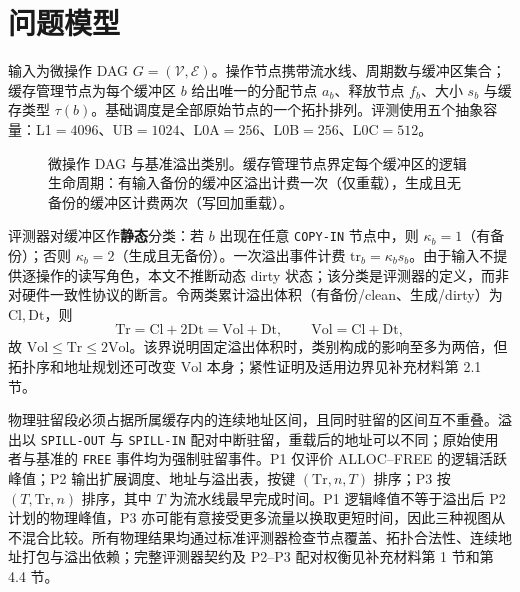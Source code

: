 \section{问题模型}\label{sec:formulation}
输入为微操作 DAG $G=(\mathcal V,\mathcal E)$。操作节点携带流水线、周期数与缓冲区集合；缓存管理节点为每个缓冲区 $b$ 给出唯一的分配节点 $a_b$、释放节点 $f_b$、大小 $s_b$ 与缓存类型 $\tau(b)$。基础调度是全部原始节点的一个拓扑排列。评测使用五个抽象容量：L1${}=4096$、UB${}=1024$、L0A${}=256$、L0B${}=256$、L0C${}=512$。

\begin{figure}[t]\centering
\resizebox{.98\linewidth}{!}{}
\caption{微操作 DAG 与基准溢出类别。缓存管理节点界定每个缓冲区的逻辑生命周期：有输入备份的缓冲区溢出计费一次（仅重载），生成且无备份的缓冲区计费两次（写回加重载）。}
\label{fig:dag-example-zh}\end{figure}

评测器对缓冲区作\textbf{静态}分类：若 $b$ 出现在任意 \texttt{COPY-IN} 节点中，则 $\kappa_b=1$（有备份）；否则 $\kappa_b=2$（生成且无备份）。一次溢出事件计费 $\mathrm{tr}_b=\kappa_b s_b$。由于输入不提供逐操作的读写角色，本文不推断动态 dirty 状态；该分类是评测器的定义，而非对硬件一致性协议的断言。令两类累计溢出体积（有备份/clean、生成/dirty）为 $\mathrm{Cl},\mathrm{Dt}$，则
\begin{equation}\label{eq:extra-decomp-zh}\mathrm{Tr}=\mathrm{Cl}+2\mathrm{Dt}=\mathrm{Vol}+\mathrm{Dt},\qquad \mathrm{Vol}=\mathrm{Cl}+\mathrm{Dt},\end{equation}
故 $\mathrm{Vol}\le\mathrm{Tr}\le2\mathrm{Vol}$。该界说明固定溢出体积时，类别构成的影响至多为两倍，但拓扑序和地址规划还可改变 $\mathrm{Vol}$ 本身；紧性证明及适用边界见补充材料第 2.1 节。

物理驻留段必须占据所属缓存内的连续地址区间，且同时驻留的区间互不重叠。溢出以 \texttt{SPILL-OUT} 与 \texttt{SPILL-IN} 配对中断驻留，重载后的地址可以不同；原始使用者与基准的 \texttt{FREE} 事件均为强制驻留事件。P1 仅评价 ALLOC--FREE 的逻辑活跃峰值；P2 输出扩展调度、地址与溢出表，按键 $(\mathrm{Tr},n,T)$ 排序；P3 按 $(T,\mathrm{Tr},n)$ 排序，其中 $T$ 为流水线最早完成时间。P1 逻辑峰值不等于溢出后 P2 计划的物理峰值，P3 亦可能有意接受更多流量以换取更短时间，因此三种视图从不混合比较。所有物理结果均通过标准评测器检查节点覆盖、拓扑合法性、连续地址打包与溢出依赖；完整评测器契约及 P2--P3 配对权衡见补充材料第 1 节和第 4.4 节。
